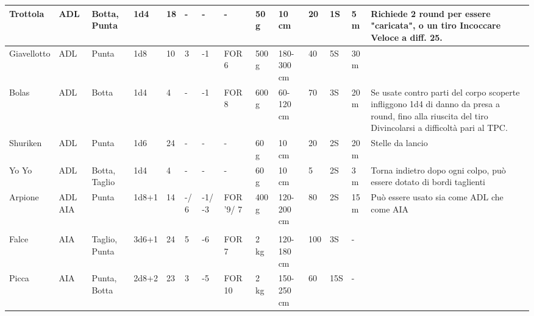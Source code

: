 {\begin{longtable}{|p{1.5cm}|p{0.7cm}|p{0.9cm}|p{0.9cm}|l|l|l|p{0.9cm}|p{0.8cm}|p{1.0cm}|l|l|p{0.75cm}|p{3.2cm}|}
  \raggedright Trottola& \raggedright ADL& \raggedright Botta, Punta& \raggedright 1d4& \raggedright 18& \raggedright -& \raggedright -& \raggedright -& \raggedright 50 g& \raggedright 10 cm& \raggedright 20& \raggedright 1S& \raggedright 5 m& \raggedright Richiede 2 round per essere "caricata", o un tiro Incoccare Veloce a diff. 25.\tabularnewline \hline
  \raggedright Giavellotto& \raggedright ADL& \raggedright Punta& \raggedright 1d8& \raggedright 10& \raggedright 3& \raggedright -1& \raggedright FOR 6& \raggedright 500 g& \raggedright 180-300 cm& \raggedright 40& \raggedright 5S& \raggedright 30 m& \raggedright \tabularnewline \hline
  \raggedright Bolas& \raggedright ADL& \raggedright Botta& \raggedright 1d4& \raggedright 4& \raggedright -& \raggedright -1& \raggedright FOR 8& \raggedright 600 g& \raggedright 60-120 cm& \raggedright 70& \raggedright 3S& \raggedright 20 m& \raggedright Se usate contro parti del corpo scoperte infliggono 1d4 di danno da presa a round, fino alla riuscita del tiro Divincolarsi a difficolt\`a pari al TPC.\tabularnewline \hline
  \raggedright Shuriken& \raggedright ADL& \raggedright Punta& \raggedright 1d6& \raggedright 24& \raggedright -& \raggedright -& \raggedright -& \raggedright 60 g& \raggedright 10 cm& \raggedright 20& \raggedright 2S& \raggedright 20 m& \raggedright Stelle da lancio\tabularnewline \hline
  \raggedright Yo Yo& \raggedright ADL& \raggedright Botta, Taglio& \raggedright 1d4& \raggedright 4& \raggedright -& \raggedright -& \raggedright -& \raggedright 60 g& \raggedright 10 cm& \raggedright 5& \raggedright 2S& \raggedright 3 m& \raggedright Torna indietro dopo ogni colpo, pu\`o essere dotato di bordi taglienti\tabularnewline \hline
  \raggedright Arpione& \raggedright ADL AIA& \raggedright Punta& \raggedright 1d8+1& \raggedright 14& \raggedright -/ 6& \raggedright -1/ -3& \raggedright FOR '9/ 7& \raggedright 400 g& \raggedright 120-200 cm& \raggedright 80& \raggedright 2S& \raggedright 15 m& \raggedright Pu\`o essere usato sia come ADL che come AIA\tabularnewline \hline
  \pagebreak\hline\multicolumn{14}{|c|}{\normalsize\sc Armi in Asta (AIA)}\tabularnewline \hline\hline
  \raggedright Falce& \raggedright AIA& \raggedright Taglio, Punta& \raggedright 3d6+1& \raggedright 24& \raggedright 5& \raggedright -6& \raggedright FOR 7& \raggedright 2 kg& \raggedright 120-180 cm& \raggedright 100& \raggedright 3S& \raggedright -& \raggedright \tabularnewline \hline
  \raggedright Picca& \raggedright AIA& \raggedright Punta, Botta& \raggedright 2d8+2& \raggedright 23& \raggedright 3& \raggedright -5& \raggedright FOR 10& \raggedright 2 kg& \raggedright 150-250 cm& \raggedright 60& \raggedright 15S& \raggedright -& \raggedright \tabularnewline \hline

\end{longtable}}
